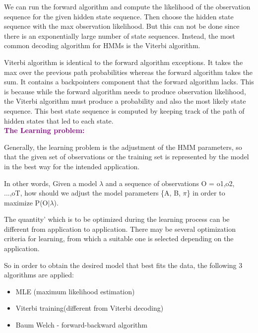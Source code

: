 We can run the forward algorithm and compute the likelihood of the observation sequence for the given hidden state sequence. Then choose the hidden state sequence with the max observation likelihood. But this can not be done since there is an exponentially large number of state sequences. Instead, the most common decoding algorithm for HMMs is the Viterbi algorithm.

Viterbi algorithm is identical to the forward algorithm exceptions. It takes the max over the previous path probabilities whereas the forward algorithm takes the sum. It contains a backpointers component that the forward algorithm lacks. This is because while the forward algorithm needs to produce observation likelihood, the Viterbi algorithm must produce a probability and also the most likely state sequence. This best state sequence is computed by keeping track of the path of hidden states that led to each state. \\

\textbf{\textcolor{purple}{The Learning problem:} }
    
Generally, the learning problem is the adjustment of the HMM parameters, so that the given set of observations or the training set is represented by the model in the best way for the intended application.

In other words, Given a model $\lambda$ and a sequence of observations O = o1,o2, ...,oT, how should we adjust the model parameters \{A, B, $\pi$\} in order to maximize P(O$|\lambda$). 

The quantity' which is to be optimized during the learning process can be different from application to application. There may be several optimization criteria for learning, from which a suitable one is selected depending on the application.

So in order to obtain the desired model that best fits the data, the following 3 algorithms are applied:  
\begin{itemize}
  \item MLE (maximum likelihood estimation) 
  \item Viterbi training(different from Viterbi decoding)  
  \item Baum Welch - forward-backward algorithm
\end{itemize}

